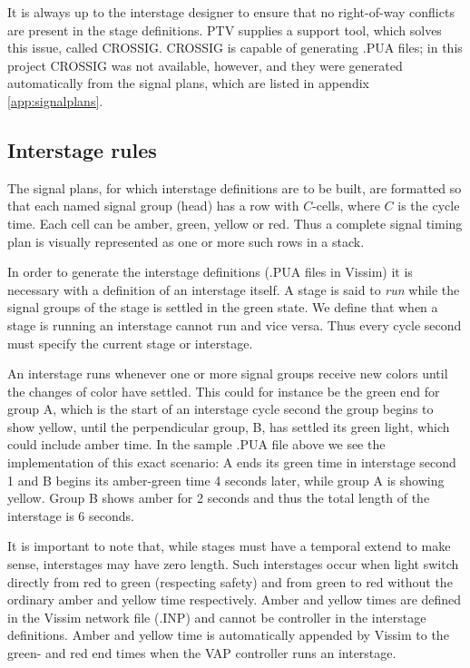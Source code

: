It is always up to the interstage designer to ensure that no right-of-way conflicts are present in the stage definitions. PTV supplies a support tool, which solves this issue, called CROSSIG. CROSSIG is capable of generating .PUA files; in this project CROSSIG was not available, however, and they were generated automatically from the signal plans, which are listed in appendix \ref{app:signalplans}.

\subsection{Interstage rules}
The signal plans, for which interstage definitions are to be built, are formatted so that each named signal group (head) has a row with $C$-cells, where $C$ is the cycle time. Each cell can be amber, green, yellow or red. Thus a complete signal timing plan is visually represented as one or more such rows in a stack.

In order to generate the interstage definitions (.PUA files in Vissim) it is necessary with a definition of an interstage itself. A stage is said to \textit{run} while the signal groups of the stage is settled in the green state. We define that when a stage is running an interstage cannot run and vice versa. Thus every cycle second must specify the current stage or interstage.

An interstage runs whenever one or more signal groups receive new colors until the changes of color have settled. This could for instance be the green end for group A, which is the start of an interstage cycle second the group begins to show yellow, until the perpendicular group, B, has settled its green light, which could include amber time. In the sample .PUA file above we see the implementation of this exact scenario: A ends its green time in interstage second 1 and B begins its amber-green time 4 seconds later, while group A is showing yellow. Group B shows amber for 2 seconds and thus the total length of the interstage is 6 seconds. 

It is important to note that, while stages must have a temporal extend to make sense, interstages may have zero length. Such interstages occur when light switch directly from red to green (respecting safety) and from green to red without the ordinary amber and yellow time respectively. Amber and yellow times are defined in the Vissim network file (.INP) and cannot be controller in the interstage definitions. Amber and yellow time is automatically appended by Vissim to the green- and red end times when the VAP controller runs an interstage.


